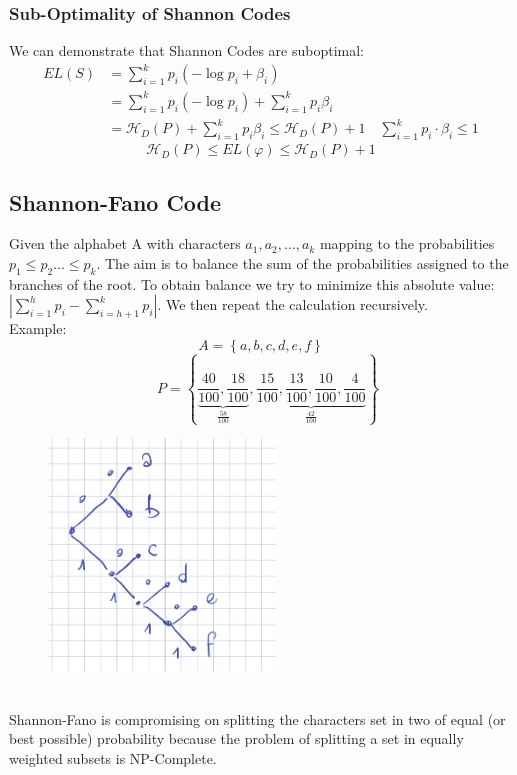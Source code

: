     \subsubsection{Sub-Optimality of Shannon Codes}
    We can demonstrate that Shannon Codes are suboptimal:
    \begin{align*}
        EL(S) &= \sum_{i=1}^{k}{p_i (-\log{p_i}+\beta_i)}\\
        &=\sum_{i=1}^{k}{p_i (-\log{p_i})} + \sum_{i=1}^{k}{p_i \beta_i}\\
        &=\mathcal{H}_D(P) + \sum_{i=1}^{k}{p_i\beta_i}\leq \mathcal{H}_D(P)+1 \quad \sum_{i=1}^{k}{p_i\cdot\beta_i} \leq1
    \end{align*}
    $$\mathcal{H}_D(P) \leq EL(\varphi) \leq \mathcal{H}_D(P)+1$$
    



    \subsection{Shannon-Fano Code}
    Given the alphabet A with characters $a_1, a_2, \ldots, a_k $ mapping to the probabilities $ p_1\leq p_2\ldots \leq p_k$. The aim is to balance the sum of the probabilities assigned to the branches of the root. To obtain balance we try to minimize this absolute value: $|\sum_{i=1}^{h}{p_i}- \sum_{i=h+1}^{k}{p_i}|$. We then repeat the calculation recursively.\\
    Example: 
    $$A= \left\{ a,b,c,d,e,f \right\}$$
    $$\quad P=\left\{ \underbrace{\frac{40}{100}, \frac{18}{100}}_{\frac{58}{100}}, \underbrace{\frac{15}{100}, \frac{13}{100}, \frac{10}{100}, \frac{4}{100}}_{\frac{42}{100}} \right\}$$
    \begin{figure}[htbp]
        \centering
        \includegraphics[width = 6cm]{Information Theory/Data Compression/ShannonFano-Tree.png}
    \end{figure}\\
    Shannon-Fano is compromising on splitting the characters set in two of equal (or best possible) probability because the problem of splitting a set in equally weighted subsets is NP-Complete.\newline



